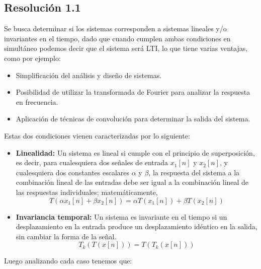 \documentclass[
  11pt,
  letterpaper,
   addpoints,
   answers
  ]{exam}
\begin{document}
\begin{questions}
\begin{solution}
  \subsection*{Resolución 1.1}
Se busca determinar si los sistemas corresponden a sistemas lineales y/o invariantes en el tiempo, dado que cuando cumplen ambas condiciones en simultáneo podemos decir que el sistema será LTI, lo que tiene varias ventajas, como por ejemplo:
\begin{itemize}
  \item Simplificación del análisis y diseño de sistemas.
  \item Posibilidad de utilizar la transformada de Fourier para analizar la respuesta en frecuencia.
  \item Aplicación de técnicas de convolución para determinar la salida del sistema.
\end{itemize}
Estas dos condiciones vienen caracterizadas por lo siguiente:
\begin{itemize}
  \item \textbf{Linealidad:} Un sistema es lineal si cumple con el principio de superposición, es decir, para cualesquiera dos señales de entrada \(x_1[n]\) y \(x_2[n]\), y cualesquiera dos constantes escalares \(\alpha\) y \(\beta\), la respuesta del sistema a la combinación lineal de las entradas debe ser igual a la combinación lineal de las respuestas individuales; matemáticamente,
  \begin{equation}
    T(\alpha x_1[n] + \beta x_2[n]) = \alpha T(x_1[n]) + \beta T(x_2[n])
  \end{equation}
  \item \textbf{Invariancia temporal:} Un sistema es invariante en el tiempo si un desplazamiento en la entrada produce un desplazamiento idéntico en la salida, sin cambiar la forma de la señal.
  \begin{equation}
    T_k(T(x[n])) = T(T_k(x[n]))
  \end{equation}
\end{itemize}
Luego analizando cada caso tenemos que:


\end{solution}
\end{questions}
\end{document}

